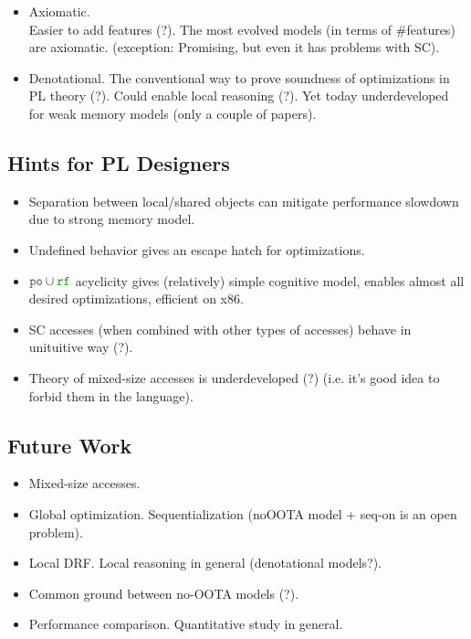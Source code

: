 \begin{itemize}
  \item Axiomatic. \\
    Easier to add features (?). 
    The most evolved models (in terms of \#features) are axiomatic.
    (exception: Promising, but even it has problems with SC).
  \item Denotational.
    The conventional way to prove soundness of optimizations in PL theory (?). 
    Could enable local reasoning (?).
    Yet today underdeveloped for weak memory models (only a couple of papers).
\end{itemize}

\subsection{Hints for PL Designers}
 
\begin{itemize}
  \item Separation between local/shared objects can mitigate
        performance slowdown due to strong memory model.
  \item Undefined behavior gives an escape hatch for optimizations.
  \item $\lPO \cup \lRF$ acyclicity gives (relatively) simple 
        cognitive model, enables almost all desired optimizations, efficient on x86.
  \item SC accesses (when combined with other types of accesses) behave in unituitive way (?).
  \item Theory of mixed-size accesses is underdeveloped (?)
        (i.e. it's good idea to forbid them in the language).
\end{itemize}

\subsection{Future Work}

\begin{itemize}
  \item Mixed-size accesses.
  \item Global optimization. 
        Sequentialization (noOOTA model + seq-on is an open problem).
  \item Local DRF. Local reasoning in general (denotational models?).
  \item Common ground between no-OOTA models (?). 
  \item Performance comparison. Quantitative study in general.
\end{itemize}